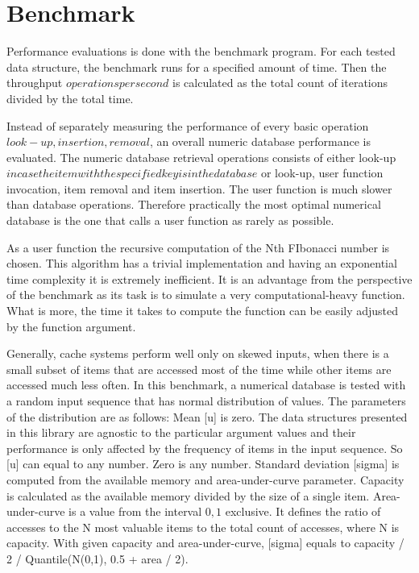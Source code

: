 \section{Benchmark}

Performance evaluations is done with the benchmark program. For each tested data structure, the benchmark runs for a specified amount of time. Then the throughput \(operations per second\) is calculated as the total count of iterations divided by the total time.

Instead of separately measuring the performance of every basic operation \(look-up, insertion, removal\), an overall numeric database performance is evaluated. The numeric database retrieval operations consists of either look-up \(in case the item with the specified key is in the database\) or look-up, user function invocation, item removal and item insertion. The user function is much slower than database operations. Therefore practically the most optimal numerical database is the one that calls a user function as rarely as possible.

As a user function the recursive computation of the Nth FIbonacci number is chosen. This algorithm has a trivial implementation and having an exponential time complexity it is extremely inefficient. It is an advantage from the perspective of the benchmark as its task is to simulate a very computational-heavy function. What is more, the time it takes to compute the function can be easily adjusted by the function argument.

Generally, cache systems perform well only on skewed inputs, when there is a small subset of items that are accessed most of the time while other items are accessed much less often. In this benchmark, a numerical database is tested with a random input sequence that has normal distribution of values. The parameters of the distribution are as follows:
Mean [u]  is zero. The data structures presented in this library are agnostic to the particular argument values and their performance is only affected by the frequency of items in the input sequence. So [u] can equal to any number. Zero is any number.
Standard deviation [sigma] is computed from the available memory and area-under-curve parameter. Capacity is calculated as the available memory divided by the size of a single item. Area-under-curve is a value from the interval \(0,1\) exclusive. It defines the ratio of accesses to the N most valuable items to the total count of accesses, where N is capacity. With given capacity and area-under-curve, [sigma] equals to capacity / 2 / Quantile(N(0,1), 0.5 + area / 2).


